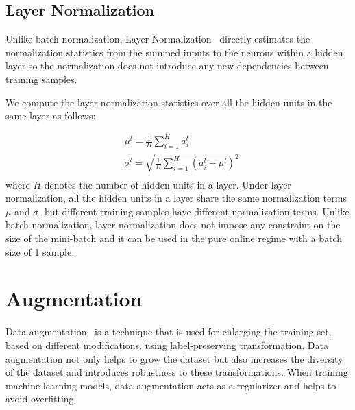 \subsection{Layer Normalization}

Unlike batch normalization, Layer Normalization~\cite{ba2016layer} directly estimates the normalization statistics from the summed inputs to the neurons within a hidden layer so the normalization does not introduce any new dependencies between training samples.

We compute the layer normalization statistics over all the hidden units in the same layer as follows:

\begin{equation}
\begin{split}
    & \mu^{l} = \frac{1}{H}\sum^{H}_{i=1}a_{i}^{l}\\
    &  \sigma^{l} = \sqrt{\frac{1}{H}\sum^{H}_{i=1}\left(a_{i}^{l}-\mu^{l}\right)^{2}} \\
\end{split}
\end{equation}
where $H$ denotes the number of hidden units in a layer. Under layer normalization, all the hidden units in a layer share the same normalization terms $\mu$ and $\sigma$, but different training samples have different normalization terms. Unlike batch normalization, layer normalization does not impose any constraint on the size of the mini-batch and it can be used in the pure online regime with a batch size of 1 sample.

\section{Augmentation}
Data augmentation~\cite{balestriero2022effects} is a technique that is used for enlarging the training set, based on different modifications, using label-preserving transformation. Data augmentation not only helps to grow the dataset but also increases the diversity of the dataset and introduces robustness to these transformations. When training machine learning models, data augmentation acts as a regularizer and helps to avoid overfitting.

